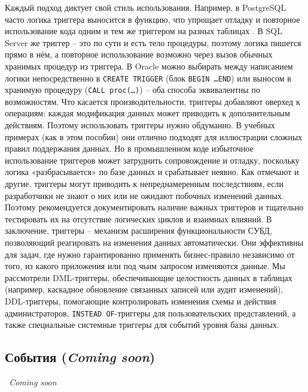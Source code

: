Каждый подход диктует свой стиль использования. Например, в PostgreSQL часто логика триггера выносится в функцию, что упрощает отладку и повторное использование кода одним и тем же триггером на разных таблицах \autocite{Postgresqltrig}. 
В SQL Server же триггер – это по сути и есть тело процедуры, поэтому логика пишется прямо в нём, а повторное использование возможно через вызов обычных хранимых процедур из триггера. 
В Oracle можно выбирать между написанием логики непосредственно в \texttt{CREATE TRIGGER} (блок \texttt{BEGIN \ldots END}) или выносом в хранимую процедуру (\texttt{CALL proc(\ldots)}) \autocite{oracledbdoc7} – оба способа эквивалентны по возможностям.
Что касается производительности, триггеры добавляют оверхед к операциям: каждая модификация данных может приводить к дополнительным действиям. Поэтому использовать триггеры нужно обдуманно. В учебных примерах (как в этом пособии) они отлично подходят для иллюстрации сложных правил поддержания данных. Но в промышленном коде избыточное использование триггеров может затруднить сопровождение и отладку, поскольку логика «разбрасывается» по базе данных и срабатывает неявно. Как отмечают \autocite{Silberschatz} и другие, триггеры могут приводить к непреднамеренным последствиям, если разработчики не знают о них или не ожидают побочных изменений данных. Поэтому рекомендуется документировать наличие важных триггеров и тщательно тестировать их на отсутствие логических циклов и взаимных влияний.
В заключение, триггеры – механизм расширения функциональности СУБД, позволяющий реагировать на изменения данных автоматически. Они эффективны для задач, где нужно гарантированно применять бизнес-правило независимо от того, из какого приложения или под чьим запросом изменяются данные. Мы рассмотрели DML-триггеры, обеспечивающие целостность данных в таблицах (например, каскадное обновление связанных записей или аудит изменений), DDL-триггеры, помогающие контролировать изменения схемы и действия администраторов, \texttt{INSTEAD OF}-триггеры для пользовательских представлений, а также специальные системные триггеры для событий уровня базы данных. 






\subsection{События (\textit{Coming soon})}

\textit{~Coming soon}





